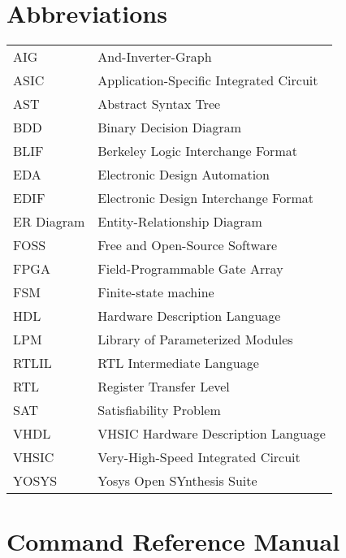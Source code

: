 \documentclass[oneside,a4paper]{book}
\begin{document}
\chapter*{Abbreviations}
\begin{tabular}{ll}
AIG         & And-Inverter-Graph \\
ASIC        & Application-Specific Integrated Circuit \\
AST         & Abstract Syntax Tree \\
BDD         & Binary Decision Diagram \\
BLIF        & Berkeley Logic Interchange Format \\
EDA         & Electronic Design Automation \\
EDIF        & Electronic Design Interchange Format \\
ER Diagram  & Entity-Relationship Diagram \\
FOSS        & Free and Open-Source Software \\
FPGA        & Field-Programmable Gate Array \\
FSM         & Finite-state machine \\
HDL         & Hardware Description Language \\
LPM         & Library of Parameterized Modules \\
RTLIL       & RTL Intermediate Language \\
RTL         & Register Transfer Level \\
SAT         & Satisfiability Problem \\
VHDL        & VHSIC Hardware Description Language \\
VHSIC       & Very-High-Speed Integrated Circuit \\
YOSYS       & Yosys Open SYnthesis Suite \\
\end{tabular}

\tableofcontents











% 

\appendix




\chapter{Command Reference Manual}
\label{commandref}




% 




\end{document}
